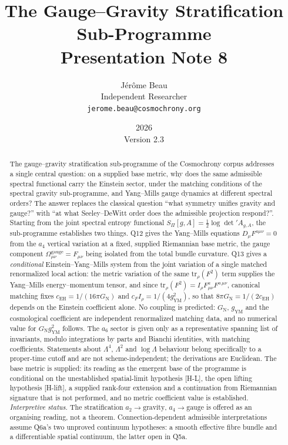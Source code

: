 \documentclass[11pt,a4paper]{article}
\title{The Gauge--Gravity Stratification Sub-Programme\\[0.4em]
\large Presentation Note 8}
\author{J\'{e}r\^{o}me Beau\\[0.3em]
\small Independent Researcher\\
\small \texttt{jerome.beau@cosmochrony.org}}
\date{2026\\[2pt]\small Version 2.3}
\theoremstyle{definition}
\newcommand{\GN}{G_{\mathrm{N}}}
\newcommand{\gYM}{g_{\mathrm{YM}}}
\newcommand{\cEH}{c_{\mathrm{EH}}}
\newcommand{\cF}{c_{F}}
\newcommand{\Irho}{I_\rho}
\newcommand{\SPI}{S_\Pi}
\begin{document}
  \maketitle

  \begin{abstract}
    The gauge--gravity stratification sub-programme of the Cosmochrony corpus addresses a
    single central question: on a supplied base metric, why does the same admissible spectral functional carry
    the Einstein sector, under the matching conditions of the spectral gravity sub-programme, and Yang--Mills
    gauge dynamics at different spectral orders?
    The answer replaces the classical question ``what symmetry unifies gravity and gauge?''
    with ``at what Seeley--DeWitt order does the admissible projection respond?''.
    Starting from the joint spectral entropy functional
    $\SPI[g,A] = \tfrac{1}{2}\log\det' A_{g,A}$, the sub-programme establishes two things.
    Q12 gives the Yang--Mills equations $D_\mu F^{a\mu\nu} = 0$ from the $a_4$ vertical variation
    at a fixed, supplied Riemannian base metric, the gauge component
    $\Omega^{\mathrm{gauge}}_{\mu\nu} = F_{\mu\nu}$ being isolated from the total bundle curvature.
    Q13 gives a \emph{conditional} Einstein--Yang--Mills system from the joint variation of a
    single matched renormalized local action: the metric variation of the same
    $\mathrm{tr}_\rho(F^2)$ term supplies the Yang--Mills energy--momentum tensor, and since
    $\mathrm{tr}_\rho(F^2) = \Irho F^a_{\mu\nu}F^{a\,\mu\nu}$, canonical matching fixes
    $\cEH = 1/(16\pi\GN)$ and $\cF\Irho = 1/(4\gYM^2)$, so that
    $8\pi\GN = 1/(2\cEH)$ depends on the Einstein coefficient alone.
    No coupling is predicted: $\GN$, $\gYM$ and the cosmological coefficient are independent
    renormalized matching data, and no numerical value for $\GN\gYM^2$ follows.
    The $a_6$ sector is given only as a representative spanning list of invariants, modulo
    integrations by parts and Bianchi identities, with matching coefficients.
    Statements about $\Lambda^4$, $\Lambda^2$ and $\log\Lambda$ behaviour belong specifically to a
    proper-time cutoff and are not scheme-independent; the derivations are Euclidean.
    The base metric is supplied: its reading as the emergent base of the programme is conditional on the
    unestablished spatial-limit hypothesis [H-L], the open lifting hypothesis [H-lift], a supplied rank-four
    extension and a continuation from Riemannian signature that is not performed, and no metric coefficient value
    is established.
    \emph{Interpretive status.} The stratification $a_2 \to \text{gravity}$,
    $a_4 \to \text{gauge}$ is offered as an organising reading, not a theorem.
  Connection-dependent admissible interpretations assume Q6a's two unproved continuum hypotheses:
    a smooth effective fibre bundle and a differentiable spatial continuum, the latter open in Q5a.
  \end{abstract}
\end{document}
